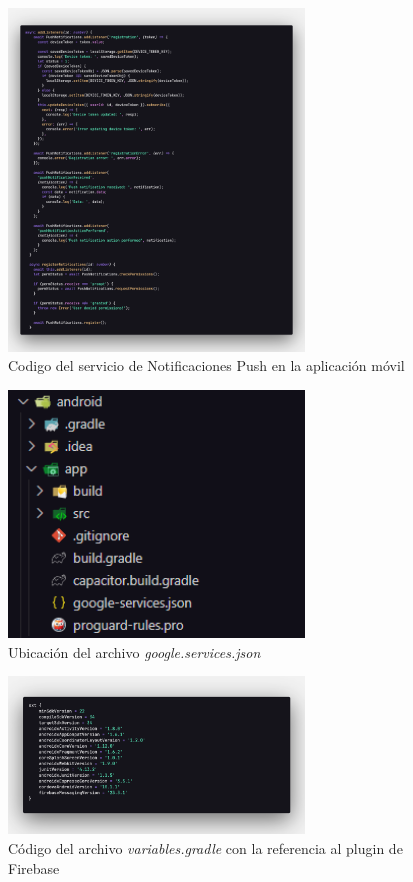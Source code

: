 \begin{figure}[H]
    \centering
    \includegraphics[width=0.7\textwidth]{resources/images/app-push}
    \caption{Codigo del servicio de Notificaciones Push en la aplicación móvil}
    \label{fig:app-push}
\end{figure}

\begin{figure}[H]
    \centering
    \includegraphics[width=0.7\textwidth]{resources/images/app-firebase-config}
    \caption{Ubicación del archivo \textit{google.services.json}}
    \label{fig:app-firebase-config}
\end{figure}

\begin{figure}[H]
    \centering
    \includegraphics[width=0.7\textwidth]{resources/images/app-gradle}
    \caption{Código del archivo \textit{variables.gradle} con la referencia al plugin de Firebase}
    \label{fig:app-gradle}
\end{figure}

